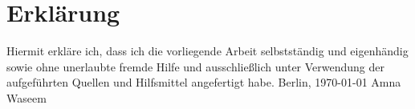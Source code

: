 \chapter*{Erkl{\"a}rung}
Hiermit erkl{\"a}re ich, dass ich die vorliegende Arbeit selbstständig und eigenh{\"a}ndig sowie ohne unerlaubte fremde Hilfe und ausschlie{\ss}lich unter Verwendung der aufgef{\"u}hrten Quellen und Hilfsmittel angefertigt habe.
\newline
\newline
Berlin, \today %
\newline
\newline
\newline
\newline
\newline
Amna Waseem

